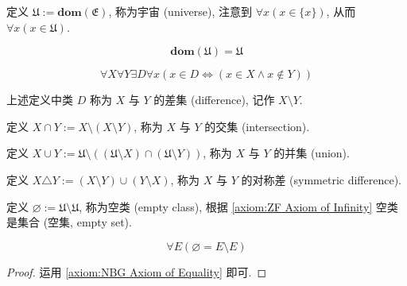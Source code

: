 \begin{definition}
    \label {definition:universe}
    定义 \(\mathfrak{U} := \mathbf{dom} (\mathfrak{E})\), 称为宇宙 (universe), 注意到 \(\forall x (x \in \{x\})\),
    从而 \(\forall x (x \in \mathfrak{U})\).
\end{definition}

\begin{corollary}
    \[
        \mathbf{dom} (\mathfrak{U}) = \mathfrak{U}
    \]
\end{corollary}

\begin{axiom}
    \label {axiom:NBG Axiom of Difference}
    \[
        \forall X \forall Y \exists D \forall x (x \in D \iff (x \in X \land x \notin Y))
    \]
\end{axiom}

\begin{definition}
    \label {definition:difference of two classes}
    上述定义中类 \(D\) 称为 \(X\) 与 \(Y\) 的差集 (difference), 记作 \(X \setminus Y\).
\end{definition}

\begin{definition}
    \label {definition:intersection of two classes}
    定义 \(X \cap Y := X \setminus (X \setminus Y)\), 称为 \(X\) 与 \(Y\) 的交集 (intersection).
\end{definition}

\begin{definition}
    \label {definition:union of two classes}
    定义 \(X \cup Y := \mathfrak{U} \setminus ((\mathfrak{U} \setminus X) \cap (\mathfrak{U} \setminus Y))\), 称为 \(X\) 与 \(Y\) 的并集 (union).
\end{definition}

\begin{definition}
    \label {definition:symmetric difference of two classes}
    定义 \(X \triangle Y := (X \setminus Y) \cup (Y \setminus X)\), 称为 \(X\) 与 \(Y\) 的对称差 (symmetric difference).
\end{definition}

\begin{definition}
    \label {definition:empty class}
    定义 \(\varnothing := \mathfrak{U} \setminus \mathfrak{U}\), 称为空类 (empty class), 根据 \ref{axiom:ZF Axiom of Infinity} 空类是集合 (空集, empty set).
\end{definition}

\begin{corollary}
    \[
        \forall E (\varnothing = E \setminus E)
    \]

    \begin{proof}
        运用 \ref{axiom:NBG Axiom of Equality} 即可.
    \end{proof}
\end{corollary}

